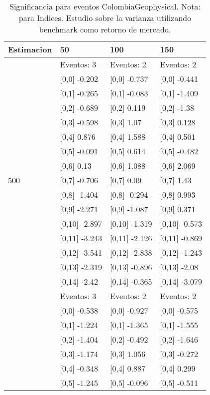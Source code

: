 \begin{table}

\caption{Significancia para eventos ColombiaGeophysical. Nota: para Indices. Estudio sobre la varianza utilizando benchmark como retorno de mercado.}
\centering
\begin{tabular}[t]{llll}
\toprule
Estimacion & 50 & 100 & 150\\
\midrule
 & Eventos:  3 & Eventos:  2 & Eventos:  2\\
 & {}[0,0] -0.202 & {}[0,0] -0.737 & {}[0,0] -0.441\\
 & {}[0,1] -0.265 & {}[0,1] -0.083 & {}[0,1] -1.409\\
 & {}[0,2] -0.689 & {}[0,2] 0.119 & {}[0,2] -1.38\\
 & {}[0,3] -0.598 & {}[0,3] 1.07 & {}[0,3] 0.128\\
\addlinespace
 & {}[0,4] 0.876 & {}[0,4] 1.588 & {}[0,4] 0.501\\
 & {}[0,5] -0.091 & {}[0,5] 0.614 & {}[0,5] -0.482\\
 & {}[0,6] 0.13 & {}[0,6] 1.088 & {}[0,6] 2.069\\
500 & {}[0,7] -0.706 & {}[0,7] 0.09 & {}[0,7] 1.43\\
 & {}[0,8] -1.404 & {}[0,8] -0.294 & {}[0,8] 0.993\\
\addlinespace
 & {}[0,9] -2.271 & {}[0,9] -1.087 & {}[0,9] 0.371\\
 & {}[0,10] -2.897 & {}[0,10] -1.319 & {}[0,10] -0.573\\
 & {}[0,11] -3.243 & {}[0,11] -2.126 & {}[0,11] -0.869\\
 & {}[0,12] -3.541 & {}[0,12] -2.838 & {}[0,12] -1.243\\
 & {}[0,13] -2.319 & {}[0,13] -0.896 & {}[0,13] -2.08\\
\addlinespace
 & {}[0,14] -2.42 & {}[0,14] -0.365 & {}[0,14] -3.079\\
 & Eventos:  3 & Eventos:  2 & Eventos:  2\\
 & {}[0,0] -0.538 & {}[0,0] -0.927 & {}[0,0] -0.575\\
 & {}[0,1] -1.224 & {}[0,1] -1.365 & {}[0,1] -1.555\\
 & {}[0,2] -1.404 & {}[0,2] -0.492 & {}[0,2] -1.646\\
\addlinespace
 & {}[0,3] -1.174 & {}[0,3] 1.056 & {}[0,3] -0.272\\
 & {}[0,4] -0.348 & {}[0,4] 0.887 & {}[0,4] 0.299\\
 & {}[0,5] -1.245 & {}[0,5] -0.096 & {}[0,5] -0.511\\

\end{tabular}
\end{table}
